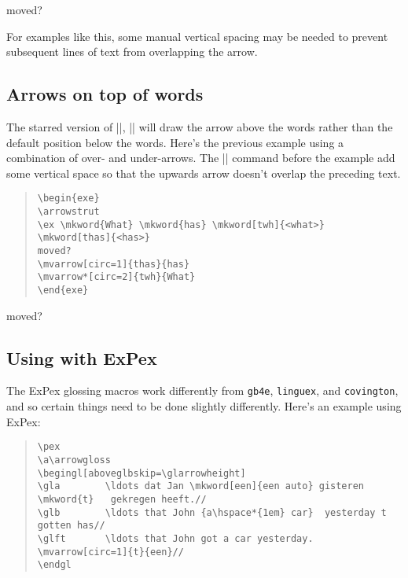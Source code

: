\documentclass[11pt]{article}
\newcommand*{\pkg}[1]{\texttt{#1}}
\begin{document}
{\begin{exe}
\ex {}    moved?
\setlength{\arrowheight}{4.5ex}
\end{exe}

For examples like this, some manual vertical spacing may be needed to prevent subsequent lines of text from overlapping the arrow.

\subsection{Arrows on top of words}
The starred version of |\mvarrow|, |\mvarrow*| will draw the arrow above the words rather than the default position below the words.  Here’s the previous example using a combination of over- and under-arrows. The |\arrowstrut| command before the example add some vertical space so that the upwards arrow doesn't overlap the preceding text.

\begin{quote}
\begin{lstlisting}
\begin{exe}
\arrowstrut
\ex \mkword{What} \mkword{has} \mkword[twh]{<what>} \mkword[thas]{<has>}
moved? 
\mvarrow[circ=1]{thas}{has} 
\mvarrow*[circ=2]{twh}{What}
\end{exe}
\end{lstlisting}
\end{quote}

\begin{exe}
\arrowstrut
\ex {}   
moved?  
\end{exe}
\clearpage
\subsection{Using with ExPex}
The ExPex glossing macros work differently from \pkg{gb4e}, \pkg{linguex}, and \pkg{covington}, and so certain things need to be done slightly differently. Here's an example using ExPex:

\begin{quote}
\begin{lstlisting}
\pex
\a\arrowgloss
\begingl[aboveglbskip=\glarrowheight]
\gla        \ldots dat Jan \mkword[een]{een auto} gisteren \mkword{t}   gekregen heeft.//
\glb        \ldots that John {a\hspace*{1em} car}  yesterday t  gotten has//
\glft       \ldots that John got a car yesterday.
\mvarrow[circ=1]{t}{een}// 
\endgl
\end{lstlisting}
\end{quote}

}
\end{document}
